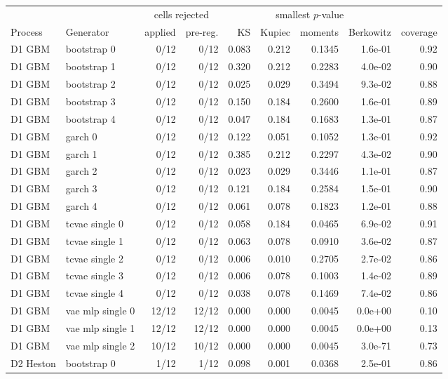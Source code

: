 \begin{tabular}{llrrrrrrr}
\toprule
& & \multicolumn{2}{c}{cells rejected} & \multicolumn{4}{c}{smallest $p$-value} & \\
\cmidrule(lr){3-4}\cmidrule(lr){5-8}
Process & Generator & applied & pre-reg. & KS & Kupiec & moments & Berkowitz & coverage \\
\midrule
D1 GBM & bootstrap 0 & 0/12 & 0/12 & 0.083 & 0.212 & 0.1345 & 1.6e-01 & 0.92 \\
D1 GBM & bootstrap 1 & 0/12 & 0/12 & 0.320 & 0.212 & 0.2283 & 4.0e-02 & 0.90 \\
D1 GBM & bootstrap 2 & 0/12 & 0/12 & 0.025 & 0.029 & 0.3494 & 9.3e-02 & 0.88 \\
D1 GBM & bootstrap 3 & 0/12 & 0/12 & 0.150 & 0.184 & 0.2600 & 1.6e-01 & 0.89 \\
D1 GBM & bootstrap 4 & 0/12 & 0/12 & 0.047 & 0.184 & 0.1683 & 1.3e-01 & 0.87 \\
D1 GBM & garch 0 & 0/12 & 0/12 & 0.122 & 0.051 & 0.1052 & 1.3e-01 & 0.92 \\
D1 GBM & garch 1 & 0/12 & 0/12 & 0.385 & 0.212 & 0.2297 & 4.3e-02 & 0.90 \\
D1 GBM & garch 2 & 0/12 & 0/12 & 0.023 & 0.029 & 0.3446 & 1.1e-01 & 0.87 \\
D1 GBM & garch 3 & 0/12 & 0/12 & 0.121 & 0.184 & 0.2584 & 1.5e-01 & 0.90 \\
D1 GBM & garch 4 & 0/12 & 0/12 & 0.061 & 0.078 & 0.1823 & 1.2e-01 & 0.88 \\
D1 GBM & tcvae single 0 & 0/12 & 0/12 & 0.058 & 0.184 & 0.0465 & 6.9e-02 & 0.91 \\
D1 GBM & tcvae single 1 & 0/12 & 0/12 & 0.063 & 0.078 & 0.0910 & 3.6e-02 & 0.87 \\
D1 GBM & tcvae single 2 & 0/12 & 0/12 & 0.006 & 0.010 & 0.2705 & 2.7e-02 & 0.86 \\
D1 GBM & tcvae single 3 & 0/12 & 0/12 & 0.006 & 0.078 & 0.1003 & 1.4e-02 & 0.89 \\
D1 GBM & tcvae single 4 & 0/12 & 0/12 & 0.038 & 0.078 & 0.1469 & 7.4e-02 & 0.86 \\
D1 GBM & vae mlp single 0 & 12/12 & 12/12 & 0.000 & 0.000 & 0.0045 & 0.0e+00 & 0.10 \\
D1 GBM & vae mlp single 1 & 12/12 & 12/12 & 0.000 & 0.000 & 0.0045 & 0.0e+00 & 0.13 \\
D1 GBM & vae mlp single 2 & 10/12 & 10/12 & 0.000 & 0.000 & 0.0045 & 3.0e-71 & 0.73 \\
D2 Heston & bootstrap 0 & 1/12 & 1/12 & 0.098 & 0.001 & 0.0368 & 2.5e-01 & 0.86 \\

\end{tabular}
